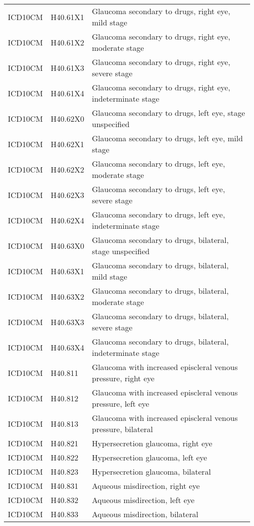 \begin{longtable}{p{}p{}p{}}
  ICD10CM & H40.61X1 & Glaucoma secondary to drugs, right eye, mild stage \\ 
  ICD10CM & H40.61X2 & Glaucoma secondary to drugs, right eye, moderate stage \\ 
  ICD10CM & H40.61X3 & Glaucoma secondary to drugs, right eye, severe stage \\ 
  ICD10CM & H40.61X4 & Glaucoma secondary to drugs, right eye, indeterminate stage \\ 
  ICD10CM & H40.62X0 & Glaucoma secondary to drugs, left eye, stage unspecified \\ 
  ICD10CM & H40.62X1 & Glaucoma secondary to drugs, left eye, mild stage \\ 
  ICD10CM & H40.62X2 & Glaucoma secondary to drugs, left eye, moderate stage \\ 
  ICD10CM & H40.62X3 & Glaucoma secondary to drugs, left eye, severe stage \\ 
  ICD10CM & H40.62X4 & Glaucoma secondary to drugs, left eye, indeterminate stage \\ 
  ICD10CM & H40.63X0 & Glaucoma secondary to drugs, bilateral, stage unspecified \\ 
  ICD10CM & H40.63X1 & Glaucoma secondary to drugs, bilateral, mild stage \\ 
  ICD10CM & H40.63X2 & Glaucoma secondary to drugs, bilateral, moderate stage \\ 
  ICD10CM & H40.63X3 & Glaucoma secondary to drugs, bilateral, severe stage \\ 
  ICD10CM & H40.63X4 & Glaucoma secondary to drugs, bilateral, indeterminate stage \\ 
  ICD10CM & H40.811 & Glaucoma with increased episcleral venous pressure, right eye \\ 
  ICD10CM & H40.812 & Glaucoma with increased episcleral venous pressure, left eye \\ 
  ICD10CM & H40.813 & Glaucoma with increased episcleral venous pressure, bilateral \\ 
  ICD10CM & H40.821 & Hypersecretion glaucoma, right eye \\ 
  ICD10CM & H40.822 & Hypersecretion glaucoma, left eye \\ 
  ICD10CM & H40.823 & Hypersecretion glaucoma, bilateral \\ 
  ICD10CM & H40.831 & Aqueous misdirection, right eye \\ 
  ICD10CM & H40.832 & Aqueous misdirection, left eye \\ 
  ICD10CM & H40.833 & Aqueous misdirection, bilateral \\ 

\end{longtable}

